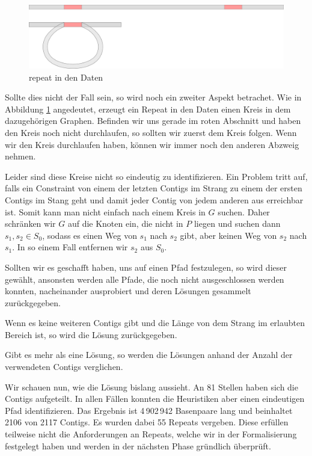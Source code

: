 \begin{figure}
	\begin{center}
		\includegraphics[width=1\textwidth]{bilder/repeat_kreis}
	\end{center}
	\label{repeat_kreis}
	\caption{repeat in den Daten}
\end{figure}
Sollte dies nicht der Fall sein, so wird noch ein zweiter Aspekt betrachet. Wie in Abbildung \ref{repeat_kreis} angedeutet, erzeugt ein Repeat in den Daten einen Kreis in dem dazugehörigen Graphen. Befinden wir uns gerade im roten Abschnitt und haben den Kreis noch nicht durchlaufen, so sollten wir zuerst dem Kreis folgen. Wenn wir den Kreis durchlaufen haben, können wir immer noch den anderen Abzweig nehmen.

Leider sind diese Kreise nicht so eindeutig zu identifizieren. 
Ein Problem tritt auf, falls ein Constraint von einem der letzten Contigs im Strang zu einem der ersten Contigs im Stang geht und damit jeder Contig von jedem anderen aus erreichbar ist. Somit kann man nicht einfach nach einem Kreis in $G$ suchen. Daher schränken wir $G$ auf die Knoten ein, die nicht in $P$ liegen und suchen dann $s_1,s_2 \in S_0$, sodass es einen Weg von $s_1$ nach $s_2$ gibt, aber keinen Weg von $s_2$ nach $s_1$. In so einem Fall entfernen wir $s_2$ aus $S_0$.

Sollten wir es geschafft haben, uns auf einen Pfad festzulegen, so wird dieser gewählt, ansonsten werden alle Pfade, die noch nicht ausgeschlossen werden konnten, nacheinander ausprobiert und deren Lösungen gesammelt zurückgegeben.

Wenn es keine weiteren Contigs gibt und die Länge von dem Strang im erlaubten Bereich ist, so wird die Lösung zurückgegeben.

Gibt es mehr als eine Lösung, so werden die Lösungen anhand der Anzahl der verwendeten Contigs verglichen. 

Wir schauen nun, wie die Lösung bislang aussieht. An 81 Stellen haben sich die Contigs aufgeteilt. In allen Fällen konnten die Heuristiken aber einen eindeutigen Pfad identifizieren. Das Ergebnis ist 4\,902\,942 Basenpaare lang und beinhaltet 2106 von 2117 Contigs. Es wurden dabei 55 Repeats vergeben. Diese erfüllen teilweise nicht die Anforderungen an Repeats, welche wir in der Formalisierung festgelegt haben und werden in der nächsten Phase gründlich überprüft.


